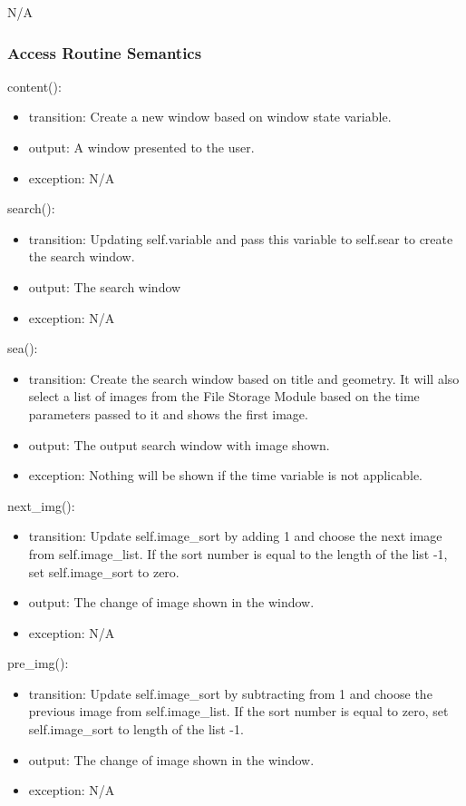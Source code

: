 \documentclass[12pt, titlepage]{article}
\begin{document}
N/A

\subsubsection{Access Routine Semantics}

\noindent content():
\begin{itemize} 
\item transition: Create a new window based on window state variable.
\item output: A window presented to the user.
\item exception: N/A 
\end{itemize}
\noindent search():
\begin{itemize} 
\item transition: Updating self.variable and pass this variable to self.sear to create the search window.
\item output: The search window
\item exception: N/A
\end{itemize}
\noindent sea():
\begin{itemize} 
\item transition: Create the search window based on title and geometry. It will also select a list of images from the File Storage Module based on the time parameters passed to it and shows the first image.
\item output: The output search window with image shown.
\item exception: Nothing will be shown if the time variable is not applicable. 
\end{itemize}
\noindent next\_img():
\begin{itemize} 
\item transition: Update self.image\_sort by adding 1 and choose the next image from self.image\_list. If the sort number is equal to the length of the list -1, set self.image\_sort to zero.
\item output: The change of image shown in the window.
\item exception: N/A
\end{itemize}
\noindent pre\_img():
\begin{itemize} 
\item transition: Update self.image\_sort by subtracting from 1 and choose the previous image from self.image\_list. If the sort number is equal to zero, set self.image\_sort to length of the list -1.
\item output: The change of image shown in the window.
\item exception: N/A
\end{itemize}
\end{document}
